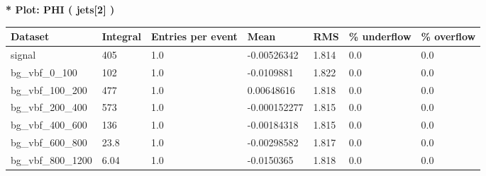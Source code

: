 \documentclass[a4paper, 10pt]{article}
\begin{document}
\textbf{* Plot: PHI ( jets[2] ) }\\
   \begin{table}[H]
  \begin{center}
    \begin{tabular}{|m{23.0mm}|m{23.0mm}|m{18.0mm}|m{19.0mm}|m{19.0mm}|m{19.0mm}|m{19.0mm}|}
      \hline
      {\cellcolor{yellow}         Dataset}& {\cellcolor{yellow}         Integral}& {\cellcolor{yellow}         Entries per event}& {\cellcolor{yellow}         Mean}& {\cellcolor{yellow}         RMS}& {\cellcolor{yellow}         \% underflow}& {\cellcolor{yellow}         \% overflow}\\
      \hline
      {\cellcolor{white}         signal}& {\cellcolor{white}         405}& {\cellcolor{white}         1.0}& {\cellcolor{white}         -0.00526342}& {\cellcolor{white}         1.814}& {\cellcolor{green}         0.0}& {\cellcolor{green}         0.0}\\
      \hline
      {\cellcolor{white}         bg\_vbf\_0\_100}& {\cellcolor{white}         102}& {\cellcolor{white}         1.0}& {\cellcolor{white}         -0.0109881}& {\cellcolor{white}         1.822}& {\cellcolor{green}         0.0}& {\cellcolor{green}         0.0}\\
      \hline
      {\cellcolor{white}         bg\_vbf\_100\_200}& {\cellcolor{white}         477}& {\cellcolor{white}         1.0}& {\cellcolor{white}         0.00648616}& {\cellcolor{white}         1.818}& {\cellcolor{green}         0.0}& {\cellcolor{green}         0.0}\\
      \hline
      {\cellcolor{white}         bg\_vbf\_200\_400}& {\cellcolor{white}         573}& {\cellcolor{white}         1.0}& {\cellcolor{white}         -0.000152277}& {\cellcolor{white}         1.815}& {\cellcolor{green}         0.0}& {\cellcolor{green}         0.0}\\
      \hline
      {\cellcolor{white}         bg\_vbf\_400\_600}& {\cellcolor{white}         136}& {\cellcolor{white}         1.0}& {\cellcolor{white}         -0.00184318}& {\cellcolor{white}         1.815}& {\cellcolor{green}         0.0}& {\cellcolor{green}         0.0}\\
      \hline
      {\cellcolor{white}         bg\_vbf\_600\_800}& {\cellcolor{white}         23.8}& {\cellcolor{white}         1.0}& {\cellcolor{white}         -0.00298582}& {\cellcolor{white}         1.817}& {\cellcolor{green}         0.0}& {\cellcolor{green}         0.0}\\
      \hline
      {\cellcolor{white}         bg\_vbf\_800\_1200}& {\cellcolor{white}         6.04}& {\cellcolor{white}         1.0}& {\cellcolor{white}         -0.0150365}& {\cellcolor{white}         1.818}& {\cellcolor{green}         0.0}& {\cellcolor{green}         0.0}\\

\end{tabular}
\end{center}
\end{table}
\end{document}
